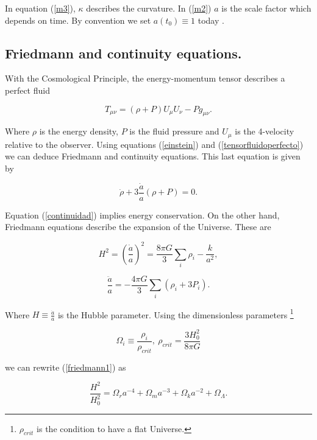 \documentclass[onecolumn,           %
               showpacs,            %
               preprintnumbers,     %
               aps,                 %
               prl,          	    %
               letterpaper,             %
               superscriptaddress,      %
               nofootinbib,         %
               tightenlines,        %
               floats,floatfix      %
               ,usenatbib,
               ]{revtex4-1}
\begin{document}
In equation (\ref{m3}), $\kappa$ describes the curvature. In (\ref{m2}) $a$ is the scale factor which depends on time. By convention we set $a(t_0) \equiv 1$ today \cite{cambridge}.

\subsection{Friedmann and continuity equations.}
With the Cosmological Principle, the energy-momentum tensor describes a perfect fluid \cite{cambridge}

\begin{equation}
\label{tensorfluidoperfecto}
T_{\mu \nu} = (\rho + P)U_{\mu}U_{\nu} - Pg_{\mu \nu} .
\end{equation} 

Where $\rho$ is the energy density, $P$ is the fluid pressure and $U_{\mu}$ is the 4-velocity relative to the observer. Using equations (\ref{einstein}) and (\ref{tensorfluidoperfecto}) we can deduce Friedmann and continuity equations. This last equation is given by

\begin{equation}
\label{continuidad}
\dot{\rho} + 3 \frac{\dot{a}}{a} \left(\rho + P\right) = 0.
\end{equation}

Equation (\ref{continuidad}) implies energy conservation. On the other hand, Friedmann equations describe the expansion of the Universe. These are

\begin{equation}
\label{friedmann1}
H^2 = \left(\frac{\dot{a}}{a}\right)^2 = \frac{8 \pi G}{3} \sum_{i}\rho_{i} - \frac{k}{a^2} ,
\end{equation}

\begin{equation}
\frac{\ddot{a}}{a} = -\frac{4 \pi G}{3} \sum_{i}\left(\rho_i + 3P_i\right) .
\end{equation}

Where $H \equiv \frac{\dot{a}}{a}$ is the Hubble parameter. Using the dimensionless parameters \footnote{$\rho_{crit}$ is the condition to have a flat Universe.}

\begin{equation}
\Omega_{i} \equiv \frac{\rho_i}{\rho_{crit}}, \ \rho_{crit} = \frac{3H_0^2}{8 \pi G}
\end{equation} 

we can rewrite (\ref{friedmann1}) as

\begin{equation}
\frac{H^2}{H_0^2} = \Omega_r a^{-4} + \Omega_m a^{-3} + \Omega_k a^{-2} + \Omega_{\Lambda} .
\end{equation}
\end{document}
